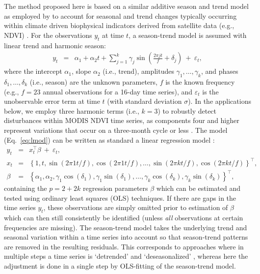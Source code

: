 \documentclass[authoryear,preprint,review,10pt]{elsarticle}
\begin{document}
The method proposed here is based on a similar additive season and trend model as employed by \citet{Verbesselt:2010wo} to account for seasonal and trend changes typically occurring within climate driven biophysical indicators derived from satellite data (e.g., NDVI)  \citep{Beurs2005a}. For the observations $y_t$ at time $t$, a season-trend model is assumed with linear trend and harmonic season:
%
\begin{eqnarray} \label{eq:lmod}
  y_t & = & \alpha_1 + \alpha_2 t + \sum_{j = 1}^k \gamma_{j} \sin \left(\frac{2\pi j t}{f} + \delta_{j} \right) ~+~ \varepsilon_t,
\end{eqnarray}
%
where the intercept $\alpha_1$, slope $\alpha_2$ (i.e., trend), amplitudes $\gamma_1, \dots, \gamma_k$,
and phases $\delta_1, \dots, \delta_k$ (i.e., season) are the unknown parameters,
$f$ is the known frequency (e.g., $f = 23$ annual observations for a 16-day time series),
and $\varepsilon_t$ is the unobservable error term at time $t$ (with standard deviation $\sigma$). In the applications
below, we employ three harmonic terms (i.e., $k = 3$) to robustly detect disturbances within MODIS NDVI time series, as components four and higher represent variations
that occur on a three-month cycle or less \citep{Geerken2009,Julien2010}. The model (Eq.~\ref{eq:lmod}) can be written as standard a linear regression model \citep[see e.g.][Chapter~3.3]{Cryer2008}:
%
\begin{eqnarray*} \label{eq:OLSlmod}
  y_t   & = & x_t^\top \beta ~+~ \varepsilon_t, \\
  x_t   & = & \left\{1, t, \sin(2 \pi 1 t / f), \cos(2 \pi 1 t / f),
              \dots, \sin(2 \pi k t / f), \cos(2 \pi k t / f)\right\}^\top, \\
  \beta & = & \left\{\alpha_1, \alpha_2, \gamma_1 \cos(\delta_1), \gamma_1 \sin(\delta_1),
              \dots, \gamma_k \cos(\delta_k), \gamma_k \sin(\delta_k)\right\}^\top,
\end{eqnarray*}
%
containing the $p = 2 + 2 k$ regression parameters $\beta$ which can be estimated and tested using ordinary least squares (OLS) techniques. 
If there are gaps in the time series $y_t$, these observations are simply omitted prior to estimation of $\beta$ which can then still consistently 
be identified (unless \emph{all} observations at certain frequencies are missing). The season-trend model takes the underlying trend and seasonal variation within a time series into account so that season-trend patterns are removed in the resulting residuals. This corresponds to approaches where in multiple steps a time series is `detrended' and `deseasonalized' \citep[e.g.][]{Potter2003}, whereas here the adjustment is done in a single step by OLS-fitting of the season-trend model.
\end{document}
